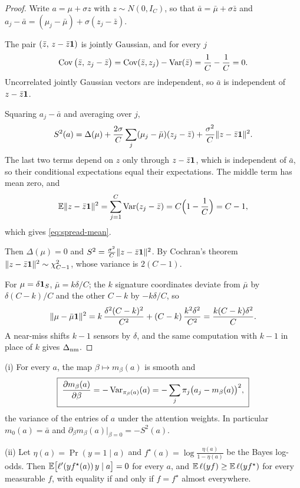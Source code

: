 \begin{proof}
Write $a=\mu+\sigma z$ with $z\sim N(0,I_C)$, so that $\bar a=\bar\mu+\sigma\bar z$ and $a_j-\bar a=(\mu_j-\bar\mu)+\sigma(z_j-\bar z)$.

 The pair $(\bar z,\,z-\bar z\mathbf{1})$ is jointly Gaussian, and for every $j$
\begin{equation}\label{eq:uncorr}
  \operatorname{Cov}\big(\bar z,\,z_j-\bar z\big)=\operatorname{Cov}(\bar z,z_j)-\operatorname{Var}(\bar z)=\frac1C-\frac1C=0 .
\end{equation}
Uncorrelated jointly Gaussian vectors are independent, so $\bar a$ is independent of $z-\bar z\mathbf{1}$.

 Squaring $a_j-\bar a$ and averaging over $j$,
\begin{equation}\label{eq:spread-expand}
  S^2(a)
  =\Delta(\mu)
  +\frac{2\sigma}{C}\sum_{j}(\mu_j-\bar\mu)(z_j-\bar z)
  +\frac{\sigma^2}{C}\|z-\bar z\mathbf{1}\|^2 .
\end{equation}
The last two terms depend on $z$ only through $z-\bar z\mathbf{1}$, which is independent of $\bar a$, so their conditional expectations equal their expectations. The middle term has mean zero, and
\begin{equation}\label{eq:chi}
  \mathbb{E}\|z-\bar z\mathbf{1}\|^2=\sum_{j=1}^C\operatorname{Var}(z_j-\bar z)=C\Big(1-\frac1C\Big)=C-1,
\end{equation}
which gives \cref{eq:spread-mean}.

 Then $\Delta(\mu)=0$ and $S^2=\frac{\sigma^2}{C}\|z-\bar z\mathbf{1}\|^2$. By Cochran's theorem $\|z-\bar z\mathbf{1}\|^2\sim\chi^2_{C-1}$, whose variance is $2(C-1)$.

 For $\mu=\delta\mathbf{1}_S$, $\bar\mu=k\delta/C$; the $k$ signature coordinates deviate from $\bar\mu$ by $\delta(C-k)/C$ and the other $C-k$ by $-k\delta/C$, so
\begin{equation}\label{eq:delta-t}
  \|\mu-\bar\mu\mathbf{1}\|^2=k\,\frac{\delta^2(C-k)^2}{C^2}+(C-k)\,\frac{k^2\delta^2}{C^2}=\frac{k(C-k)\delta^2}{C}.
\end{equation}
A near-miss shifts $k-1$ sensors by $\delta$, and the same computation with $k-1$ in place of $k$ gives $\Delta_{\mathrm{nm}}$.
\end{proof}

\begin{lemma}\label{lem:calc}
(i) For every $a$, the map $\beta\mapsto m_\beta(a)$ is smooth and
\begin{equation}\label{eq:dm}
  \boxed{\;\frac{\partial m_\beta(a)}{\partial\beta}=-\operatorname{Var}_{\pi_\beta(a)}(a)=-\sum_j\pi_j\big(a_j-m_\beta(a)\big)^2,\;}
\end{equation}
the variance of the entries of $a$ under the attention weights. In particular $m_0(a)=\bar a$ and $\partial_\beta m_\beta(a)\big|_{\beta=0}=-S^2(a)$.

(ii) Let $\eta(a)=\Pr(y=1\mid a)$ and $f^\star(a)=\log\frac{\eta(a)}{1-\eta(a)}$ be the Bayes log-odds. Then $\mathbb{E}\big[\ell'(yf^\star(a))\,y\mid a\big]=0$ for every $a$, and $\mathbb{E}\,\ell(yf)\ge\mathbb{E}\,\ell(yf^\star)$ for every measurable $f$, with equality if and only if $f=f^\star$ almost everywhere.
\end{lemma}

